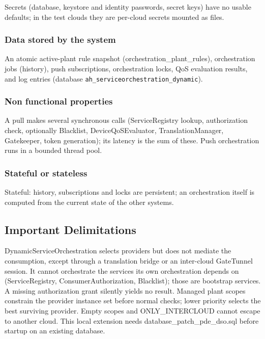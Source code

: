 \documentclass[a4paper]{arrowhead}
\begin{document}
Secrets (database, keystore and identity passwords, secret keys) have no usable defaults; in the test clouds they are per-cloud secrets mounted as files.

\subsubsection{Data stored by the system}

An atomic active-plant rule snapshot (orchestration\_plant\_rules), orchestration jobs (history), push subscriptions, orchestration locks, QoS evaluation results, and log entries (database \texttt{ah\_\allowbreak{}serviceorchestration\_\allowbreak{}dynamic}).

\subsubsection{Non functional properties}

A pull makes several synchronous calls (ServiceRegistry lookup, authorization check, optionally Blacklist, Device\allowbreak{}Qo\allowbreak{}SEvaluator, Translation\allowbreak{}Manager, Gatekeeper, token generation); its latency is the sum of these. Push orchestration runs in a bounded thread pool.

\subsubsection{Stateful or stateless}

Stateful: history, subscriptions and locks are persistent; an orchestration itself is computed from the current state of the other systems.

\subsection{Important Delimitations}
\label{sec:delimitations}

Dynamic\allowbreak{}Service\allowbreak{}Orchestration selects providers but does not mediate the consumption, except through a translation bridge or an inter-cloud GateTunnel session. It cannot orchestrate the services its own orchestration depends on (ServiceRegistry, Consumer\allowbreak{}Authorization, Blacklist); those are bootstrap services. A missing authorization grant silently yields no result. Managed plant scopes constrain the provider instance set before normal checks; lower priority selects the best surviving provider. Empty scopes and ONLY\_INTERCLOUD cannot escape to another cloud. This local extension needs database\_patch\_pde\_dso.sql before startup on an existing database.
\end{document}
